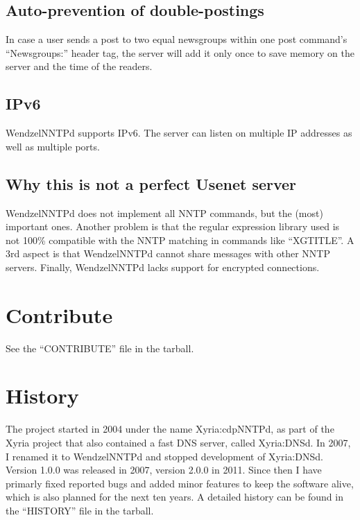 \subsection{Auto-prevention of double-postings}

In case a user sends a post to two equal newsgroups within one post command's ``Newsgroups:'' header tag, the server will add it only once to save memory on the server and the time of the readers.

\subsection{IPv6}

WendzelNNTPd supports IPv6. The server can listen on multiple IP addresses as well as multiple ports.

\subsection{Why this is not a perfect Usenet server}

WendzelNNTPd does not implement all NNTP commands, but the (most) important ones. Another problem is that the regular expression library used is not 100\% compatible with the NNTP matching in commands like ``XGTITLE''. A 3rd aspect is that WendzelNNTPd cannot share messages with other NNTP servers. Finally, WendzelNNTPd lacks support for encrypted connections.

\section{Contribute}

See the ``CONTRIBUTE'' file in the tarball.

\section{History}

The project started in 2004 under the name Xyria:cdpNNTPd, as part of the Xyria project that also contained a fast DNS server, called Xyria:DNSd. In 2007, I renamed it to WendzelNNTPd and stopped development of Xyria:DNSd. Version 1.0.0 was released in 2007, version 2.0.0 in 2011. Since then I have primarly fixed reported bugs and added minor features to keep the software alive, which is also planned for the next ten years. A detailed history can be found in the ``HISTORY'' file in the tarball.





